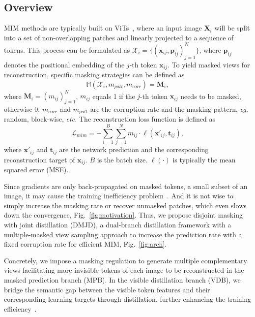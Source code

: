 \documentclass[lettersize,journal]{IEEEtran}
\begin{document}
\subsection{Overview}
MIM methods are typically built on ViTs~\cite{2021arXiv210313915S}, where an input image $\bm{X}_{i}$ will be split into a set of non-overlapping patches and linearly projected to a sequence of tokens. This process can be formulated as $\mathcal{X}_{i} = \{(\bm{x}_{ij}, \bm{p}_{ij})_{j=1}^N\}$, where $\bm{p}_{ij}$ denotes the positional embedding of the $j$-th token $\bm{x}_{ij}$. To yield masked views for reconstruction, specific masking strategies can be defined as
\begin{equation}
    \mathbb{M}(\mathcal{X}_{i}, m_{patt}, m_{corr}) = \bm{M}_{i},
    \label{eq:masking function}
\end{equation}
where $\bm{M}_{i} = (m_{ij})_{j=1}^{N}$, $m_{ij}$ equals 1 if the $j$-th token $\bm{x}_{ij}$ needs to be masked, otherwise 0. $m_{corr}$ and $m_{patt}$ are the corruption rate and the masking pattern, \textit{eg.} random, block-wise, \textit{etc.}
The reconstruction loss function is defined as
\begin{equation}
    \mathcal{L}_{mim} = -\sum_{i = 1}^{B} \sum_{j = 1}^{N} m_{ij} \cdot \ell (\bm{x}'_{ij}, \bm{t}_{ij}),
    \label{eq:mim_loss}
\end{equation}
where $\bm{x}'_{ij}$ and $\bm{t}_{ij}$ are the network prediction and the corresponding reconstruction target of $\bm{x}_{ij}$. $B$ is the batch size. $\ell (\cdot)$ is typically the mean squared error (MSE).

Since gradients are only back-propagated on masked tokens, a small subset of an image, it may cause the training inefficiency problem~\cite{2020arXiv200310555C,2022arXiv220208005W}.
And it is not wise to simply increase the masking rate or recover unmasked patches, which even slows down the convergence, Fig.~\ref{fig:motivation}. Thus, we propose disjoint masking with joint distillation (DMJD), a dual-branch distillation framework with a multiple-masked view sampling approach to increase the prediction rate with a fixed corruption rate for efficient MIM, Fig.~\ref{fig:arch}. 

Concretely, we impose a masking regulation to generate multiple complementary views facilitating more invisible tokens of each image to be reconstructed in the masked prediction branch (MPB). 
In the visible distillation branch (VDB), we bridge the semantic gap between the visible token features and their corresponding learning targets through distillation, further enhancing the training efficiency~\cite{2021arXiv211209133W, Baevski2022data2vecAG, 2022arXiv220514141W}. 
\end{document}

